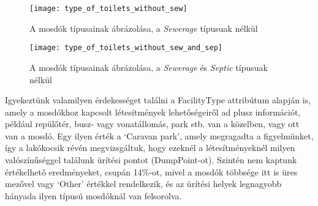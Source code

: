 	\begin{figure}[!ht]
		\centering	
			\texttt{[image: type\_of\_toilets\_without\_sew]}
			\caption{A mosdók típusainak ábrázolása, a \textit{Sewerage} típusuak nélkül}
	\end{figure}
	\begin{figure}[!ht]
		\centering	
			\texttt{[image: type\_of\_toilets\_without\_sew\_and\_sep]}
			\caption{A mosdók típusainak ábrázolása, a \textit{Sewerage} és \textit{Septic} típusuak nélkül}
	\end{figure}
	Igyekeztünk valamilyen érdekességet találni a FacilityType attribútum alapján is, amely a mosdókhoz kapcsolt létesítmények lehetőségeiről ad plusz információt, például repülőtér, busz- vagy vonatállomás, park stb. van a közelben, vagy ott van a mosdó. Egy ilyen érték a ‘Caravan park’, amely megragadta a figyelmünket, így a lakókocsik révén megvizsgáltuk, hogy ezeknél a létesítményeknél milyen valószínűséggel találunk ürítési pontot (DumpPoint-ot). Szintén nem kaptunk értékelhető eredményeket, csupán 14\%-ot, mivel a mosdók többsége itt is üres mezővel vagy ‘Other’ értékkel rendelkezik, és az ürítési helyek leg\-na\-gyobb hányada ilyen típusú mosdóknál van felsorolva.

	
	